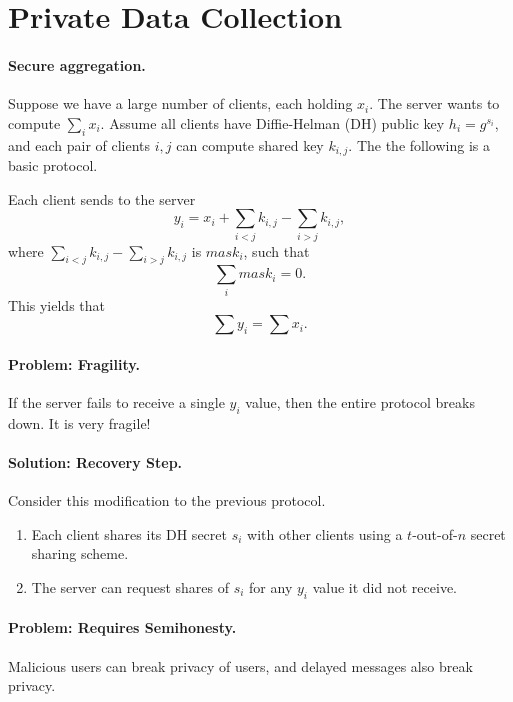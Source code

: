 \section{Private Data Collection}

\paragraph{Secure aggregation.}
Suppose we have a large number of clients, each holding $x_i$.
The server wants to compute $\sum_i x_i$.
Assume all clients have Diffie-Helman (DH) public key $h_i = g^{s_i}$,
and each pair of clients $i,j$ can compute shared key $k_{i,j}$.
The the following is a basic protocol.

\begin{prcl}
Each client sends to the server 
\[
    y_i = x_i + \sum_{i < j} k_{i, j} - \sum_{i > j} k_{i, j},
\]
where $\sum_{i < j} k_{i, j} - \sum_{i > j} k_{i, j}$ is $mask_i$,
such that 
\[
    \sum_i mask_i = 0.
\]
This yields that 
\[
    \sum y_i = \sum x_i.
\]
\end{prcl}

\paragraph{Problem: Fragility.} If the server fails to receive a single $y_i$ value, then the entire protocol breaks down. It is very fragile!

\paragraph{Solution: Recovery Step.}
Consider this modification to the previous protocol.

\begin{enumerate}
\item 
Each client shares its DH secret $s_i$ with other clients using a $t$-out-of-$n$ secret sharing scheme.
\item 
The server can request shares of $s_i$ for any $y_i$ value it did not receive.
\end{enumerate}


\paragraph{Problem: Requires Semihonesty.} 
Malicious users can break privacy of users, and 
delayed messages also break privacy.


